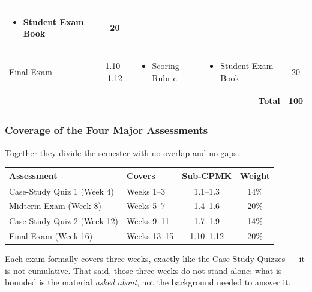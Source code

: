 \begin{frame}
\begin{table}[h!]
\begin{tabular}{|m{4.0cm}|c|m{3.6cm}|m{3.0cm}|c|}
\begin{itemize}
    \item Student Exam Book
\end{itemize} & 20 \\ \hline
Final Exam & 1.10--1.12 &
\begin{itemize}\setlength\itemsep{0pt}
    \item Scoring Rubric
\end{itemize} &
\begin{itemize}\setlength\itemsep{0pt}
    \item Student Exam Book
\end{itemize} & 20 \\ \hline
\multicolumn{4}{|r|}{\textbf{Total}} & \textbf{100} \\ \hline
\end{tabular}
\end{table}
\end{frame}

\begin{frame}
\frametitle{Coverage of the Four Major Assessments}
\small
Together they divide the semester with no overlap and no gaps.
\begin{center}\footnotesize
\begin{tabular}{|l|l|c|c|}
\hline
\textbf{Assessment} & \textbf{Covers} & \textbf{Sub-CPMK} & \textbf{Weight} \\ \hline
Case-Study Quiz 1 (Week 4) & Weeks 1--3 & 1.1--1.3 & 14\% \\ \hline
Midterm Exam (Week 8) & Weeks 5--7 & 1.4--1.6 & 20\% \\ \hline
Case-Study Quiz 2 (Week 12) & Weeks 9--11 & 1.7--1.9 & 14\% \\ \hline
Final Exam (Week 16) & Weeks 13--15 & 1.10--1.12 & 20\% \\ \hline
\end{tabular}
\end{center}
\vspace{0.2cm}
\footnotesize
Each exam formally covers three weeks, exactly like the Case-Study Quizzes --- it is not cumulative. That said, those three weeks do not stand alone: what is bounded is the material \emph{asked about}, not the background needed to answer it.
\end{frame}

